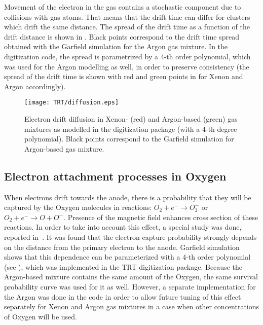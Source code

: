 
Movement of the electron in the gas contains a stochastic component due to collisions with gas atoms. 
That means that the drift time can differ for clusters which drift the same distance.
The spread of the drift time as a function of the drift distance is shown in .
Black points correspond to the drift time spread obtained with the Garfield simulation for the Argon gas mixture.
In the digitization code, the spread is parametrized by a 4-th order polynomial, which was used for the Argon modelling as well,
in order to preserve consistency (the spread of the drift time is shown with red and green points in  for Xenon and Argon accordingly).

\begin{figure}
\begin{center}
\texttt{[image: TRT/diffusion.eps]}
\caption{Electron drift diffusion in Xenon- (red) and Argon-based (green) gas mixtures as modelled in the digitization package (with a 4-th degree polynomial). 
Black points correspond to the Garfield simulation for Argon-based gas mixture.}
\label{fig:diffusion}
\end{center}
\end{figure}


\subsection{Electron attachment processes in Oxygen}
\label{subsec:recapture}
When electrons drift towards the anode, there is a probability that they will be captured by the Oxygen molecules in reactions:
$O_2 + e^- \to O_2^-$ or $O_2 + e^- \to O + O^-$. Presence of the magnetic field enhances cross section of these reactions.
In order to take into account this effect, a special study was done, reported in~\cite{esben_thesis}.
It was found that the electron capture probability strongly depends on the distance from the primary electron to the anode.
Garfield simulation shows that this dependence can be parameterized with a 4-th order polynomial (see ), 
which was implemented in the TRT digitization package. 
Because the Argon-based mixture contains the same amount of the Oxygen, the same survival probability
curve was used for it as well. However, a separate implementation for the Argon was done in the code in order to allow future tuning of this effect separately for Xenon and Argon gas mixtures
in a case when other concentrations of Oxygen will be used.

